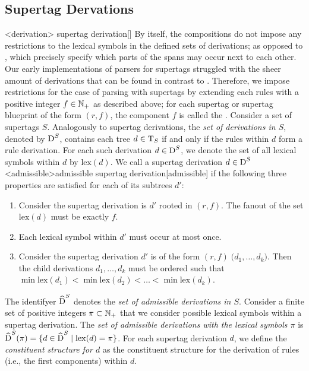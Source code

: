 \documentclass[../../document.tex]{subfiles}
\begin{document}
    \subsection*{ Supertag Dervations}
    <derivation>{ supertag derivation}[]
    By itself, the  compositions do not impose any restrictions to the lexical symbols in the defined sets of derivations; as opposed to , which precisely specify which parts of the spans may occur next to each other.
    Our early implementations of parsers for  supertags struggled with the sheer amount of derivations that can be found in contrast to .
    Therefore, we impose restrictions for the case of parsing with  supertags by extending each rules with a positive integer \(f\in \mathbb{N}_+\) as described above; for each  supertag or  supertag blueprint of the form \((r,f)\), the component \(f\) is called the .
    Consider a set of  supertags \(S\).
    Analogously to  supertag derivations, the \emph{set of derivations in \(S\)}, denoted by \(\operatorname{D}^S\), contains each tree \(d \in \operatorname{T}_S\) if and only if the  rules within  \(d\) form a  rule derivation.
    For each such derivation \(d \in \operatorname{D}^S\), we denote the set of all lexical symbols within \(d\) by \(\mathrm{lex}(d)\).
    We call a  supertag derivation \(d \in \operatorname{D}^S\) <admissible>{admissible  supertag derivation}[admissible] if the following three properties are satisfied for each of its subtrees $d'$:
    \begin{enumerate}
        \item 
            Consider the  supertag derivation is $d'$ rooted in \((r,f)\).
            The fanout of the set \(\mathrm{lex}(d)\) must be exactly \(f\).
        \item
            Each lexical symbol within \(d'\) must occur at most once.
        \item\label{prop:dcp:admissible:order}
            Consider the supertag derivation $d'$ is of the form \((r,f)\;\big( d_1, \ldots, d_k \big)\).
            Then the child derivations \(d_1, \ldots, d_k\) must be ordered such that \(\min \mathrm{lex}(d_1) < \min \mathrm{lex}(d_2) < \ldots < \min \mathrm{lex}(d_k)\). 
    \end{enumerate}
    The identifyer \(\widehat{\operatorname{D}}^S\) denotes the \emph{set of admissible derivations in \(S\)}.
    Consider a finite set of positive integers \(\pi \subset \mathbb{N}_+\) that we consider possible lexical symbols within a  supertag derivation.
    The \emph{set of admissible derivations with the lexical symbols \(\pi\)} is \(\widehat{\operatorname{D}}^S(\pi) = \{d\in \widehat{\operatorname{D}}^S \mid \mathrm{lex}(d) = \pi\}\).
    For each  supertag derivation \(d\), we define the \emph{constituent structure for \(d\)} as the constituent structure for the derivation of  rules (i.e., the first components) within \(d\).
\end{document}
